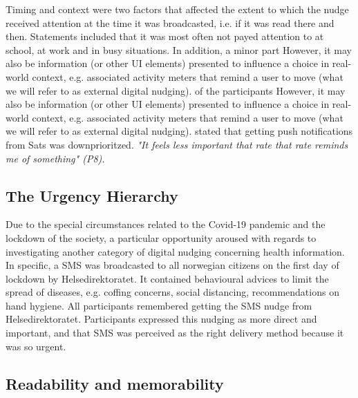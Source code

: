 Timing and context were two factors that affected the extent to which the nudge received attention at the time it was broadcasted, i.e. if it was read there and then. Statements included that it was most often not payed attention to at school, at work and in busy situations. In addition, a minor part However, it may also be information (or other UI elements) presented to influence a choice in real-world context, e.g. associated activity meters that remind a user to move (what we will refer to as external digital nudging).  of the participants However, it may also be information (or other UI elements) presented to influence a choice in real-world context, e.g. associated activity meters that remind a user to move (what we will refer to as external digital nudging).  stated that getting push notifications from Sats was downprioritzed.\textit{ "It feels less important that rate that rate reminds me of something" (P8). }

\subsection{The Urgency Hierarchy}
Due to the special circumstances related to the Covid-19 pandemic and the lockdown of the society, a particular opportunity aroused with regards to investigating another category of digital nudging concerning health information. In specific, a SMS was broadcasted to all norwegian citizens on the first day of lockdown by Helsedirektoratet. It contained behavioural advices to limit the spread of diseases, e.g. coffing concerns, social distancing, recommendations on hand hygiene. All participants remembered getting the SMS nudge from Helsedirektoratet. Participants expressed this nudging as more direct and important, and that SMS was perceived as the right delivery method because it was so urgent. 

\subsection{Readability and memorability}

